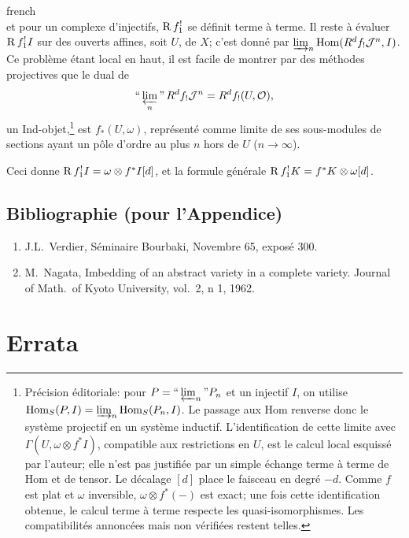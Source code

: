 \begin{hyphenrules}{french}
\[\]
et pour un complexe d'injectifs, $\operatorname{R} f_{1}^{!}$ se d\'efinit terme \`a terme. Il reste \`a \'evaluer $\operatorname{R} f_{1}^{!}I$ sur des ouverts affines, soit $U$, de $X$; c'est donn\'e par $\varinjlim_{n}\operatorname{Hom}(R^{d}f_{!}\mathcal{J}^{n}, I)$. Ce probl\`eme \'etant local en haut, il est facile de montrer par des m\'ethodes projectives que le dual de
\[
\text{``}\varprojlim_{n}\text{''}\,R^{d}f_{!}\mathcal{J}^{n}
 = R^{d}f_{!}(U,\mathcal{O}),
\]
un Ind-objet,\footnote{Pr\'ecision \'editoriale: pour $P=\text{``}\varprojlim_n\text{''}P_n$ et un injectif $I$, on utilise $\operatorname{Hom}_S(P,I)=\varinjlim_n\operatorname{Hom}_S(P_n,I)$. Le passage aux Hom renverse donc le syst\`eme projectif en un syst\`eme inductif. L'identification de cette limite avec $\Gamma(U,\omega\otimes f^*I)$, compatible aux restrictions en $U$, est le calcul local esquiss\'e par l'auteur; elle n'est pas justifi\'ee par un simple \'echange terme \`a terme de Hom et de tensor. Le d\'ecalage $[d]$ place le faisceau en degr\'e $-d$. Comme $f$ est plat et $\omega$ inversible, $\omega\otimes f^*(-)$ est exact; une fois cette identification obtenue, le calcul terme \`a terme respecte les quasi-isomorphismes. Les compatibilit\'es annonc\'ees mais non v\'erifi\'ees restent telles.} est $f_{*}(U,\omega)$, repr\'esent\'e comme limite de ses sous-modules de sections ayant un p\^ole d'ordre au plus $n$ hors de $U$ ($n \to \infty$).

Ceci donne $\operatorname{R} f_{1}^{!}I = \omega \otimes f^{*}I[d]$, et la formule g\'en\'erale $\operatorname{R} f_{1}^{!}K = f^{*}K \otimes \omega[d]$.

\section*{Bibliographie (pour l'Appendice)}
\begin{enumerate}
\item[{[1]}]\label{app:bib1} J.L.\ Verdier, S\'eminaire Bourbaki, Novembre 65, expos\'e 300.
\item[{[2]}]\label{app:bib2} M.\ Nagata, Imbedding of an abstract variety in a complete variety. Journal of Math.\ of Kyoto University, vol.\ 2, n\textdegree{} 1, 1962.
\end{enumerate}

\end{hyphenrules}

\clearpage
\chapter*{Errata}

